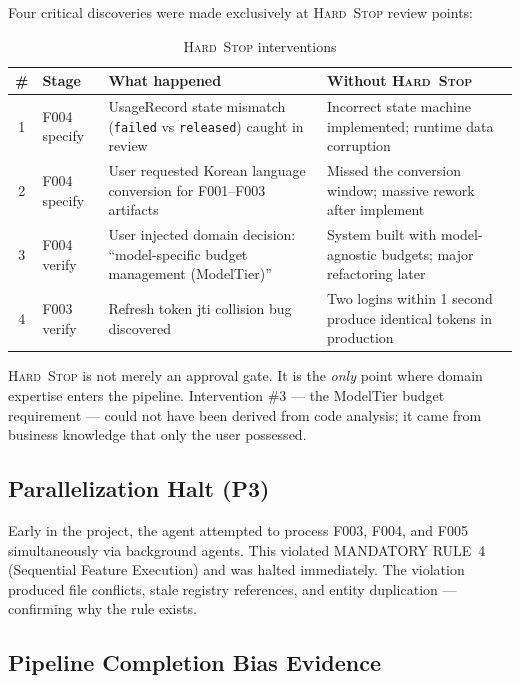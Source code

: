 \documentclass[11pt,a4paper,openright,twoside]{report}
\newcommand{\hardstop}{\textsc{Hard~Stop}}
\begin{document}
Four critical discoveries were made exclusively at \hardstop{} review points:

\begin{table}[H]
\centering
\caption{\hardstop{} interventions}
\label{tab:aegis-hardstop}
\begin{tabularx}{\textwidth}{clXX}
\toprule
\textbf{\#} & \textbf{Stage} & \textbf{What happened} & \textbf{Without \hardstop{}} \\
\midrule
1 & F004 specify & UsageRecord state mismatch (\texttt{failed} vs \texttt{released}) caught in review & Incorrect state machine implemented; runtime data corruption \\
2 & F004 specify & User requested Korean language conversion for F001--F003 artifacts & Missed the conversion window; massive rework after implement \\
3 & F004 verify & User injected domain decision: ``model-specific budget management (ModelTier)'' & System built with model-agnostic budgets; major refactoring later \\
4 & F003 verify & Refresh token jti collision bug discovered & Two logins within 1 second produce identical tokens in production \\
\bottomrule
\end{tabularx}
\end{table}

\begin{dangerbox}
\hardstop{} is not merely an approval gate. It is the \emph{only} point where domain expertise enters the pipeline. Intervention \#3 --- the ModelTier budget requirement --- could not have been derived from code analysis; it came from business knowledge that only the user possessed.
\end{dangerbox}

\subsection{Parallelization Halt (P3)}

Early in the project, the agent attempted to process F003, F004, and F005 simultaneously via background agents. This violated MANDATORY RULE~4 (Sequential Feature Execution) and was halted immediately. The violation produced file conflicts, stale registry references, and entity duplication --- confirming why the rule exists.

\subsection{Pipeline Completion Bias Evidence}
\end{document}
